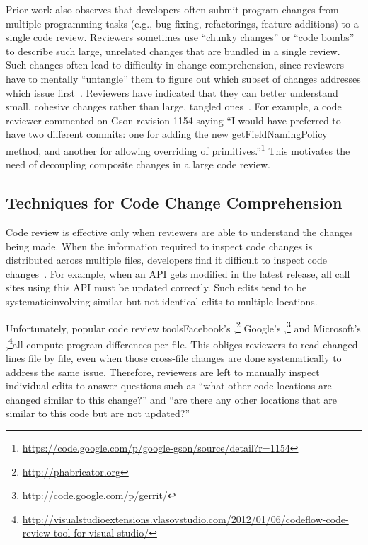 \documentclass[runningheads,a4paper]{llncs}
\begin{document}
Prior work also observes that developers often submit program changes from multiple programming tasks (e.g., bug fixing, refactorings, feature additions) to a single code review. Reviewers sometimes use ``chunky changes'' or ``code bombs'' to describe such large, unrelated changes that are bundled in a single review. Such changes often lead to difficulty in change comprehension, since reviewers have to mentally ``untangle'' them to figure out which subset of changes addresses which issue first~\cite{kawrykow2011non, murphy2012we, herzig2013impact}. Reviewers have indicated that they can better understand small, cohesive changes rather than large, tangled ones~\cite{rigby2008open}. For example, a code reviewer commented on Gson revision 1154 saying ``I would have preferred to have two different commits: one for adding the new {\ttt getFieldNamingPolicy} method, and another for allowing overriding of primitives.''\footnote{\url{https://code.google.com/p/google-gson/source/detail?r=1154}} This motivates the need of decoupling composite changes in a large code review. 



\subsection{Techniques for Code Change Comprehension} 

Code review is effective only when reviewers are able to understand the changes being made. When the information required to inspect code changes is distributed across multiple files, developers find it difficult to inspect code changes~\cite{dunsmore2000object}. For example, when an API gets modified in the latest release, all call sites using this API must be updated correctly. Such edits tend to be systematic\textemdash involving similar but not identical edits to multiple locations.



Unfortunately, popular code review tools\textemdash Facebook's {\phabricator},\footnote{\url{http://phabricator.org}} Google's {\gerrit},\footnote{\url{http://code.google.com/p/gerrit/}} and Microsoft's {\codeflow},\footnote{\url{http://visualstudioextensions.vlasovstudio.com/2012/01/06/codeflow-code-review-tool-for-visual-studio/}}\textemdash all compute program differences per file. This obliges reviewers to read changed lines file by file, even when those cross-file changes are done systematically to address the same issue. Therefore, reviewers are left to manually inspect individual edits to answer questions such as ``what other code locations are changed similar to this change?'' and ``are there any other locations that are similar to this code but are not updated?''
\end{document}
